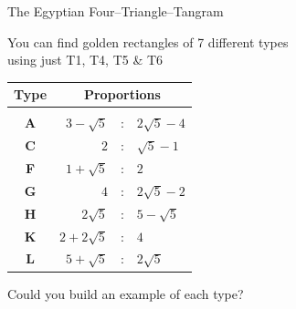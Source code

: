 \documentclass[14pt]{beamer}
\begin{document}
    \begin{frame}{The Egyptian Four--Triangle--Tangram}
        \begin{center}
            You can find golden rectangles of 7 different types\\[0.5ex]using just T1, T4, T5 \& T6

            \bigskip\medskip

            {\small\begin{tabular}{c|rcl}
                \textbf{Type} & \multicolumn{3}{c}{\textbf{Proportions}} \\[0.5ex]\hline&&&\\[-1.5ex]
                \textbf{A} & $3\!-\!\sqrt{5}$  &\!\!\!\!:\!\!\!\!& $2\sqrt{5}\!-\!4$ \\
                \textbf{C} & $2$               &\!\!\!\!:\!\!\!\!& $\sqrt{5}\!-\!1$  \\
                \textbf{F} & $1\!+\!\sqrt{5}$  &\!\!\!\!:\!\!\!\!& $2$               \\
                \textbf{G} & $4$               &\!\!\!\!:\!\!\!\!& $2\sqrt{5}\!-\!2$ \\
                \textbf{H} & $2\sqrt{5}$       &\!\!\!\!:\!\!\!\!& $5\!-\!\sqrt{5}$  \\
                \textbf{K} & $2\!+\!2\sqrt{5}$ &\!\!\!\!:\!\!\!\!& $4$               \\
                \textbf{L} & $5\!+\!\sqrt{5}$  &\!\!\!\!:\!\!\!\!& $2\sqrt{5}$       \\
            \end{tabular}}

            \bigskip\medskip

            Could you build an example of each type?
        \end{center}
    \end{frame}

\end{document}

